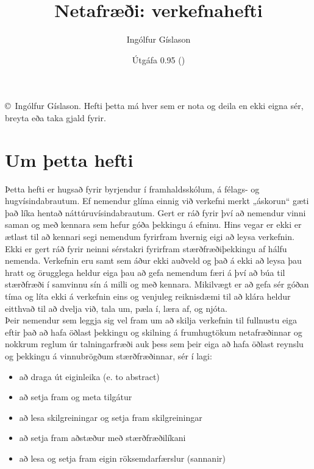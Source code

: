 \documentclass[b5paper,12pt]{book}
\title{\Huge Netafræði: verkefnahefti}
\author{Ingólfur Gíslason}
\date{Útgáfa 0.95 (\the\year)}
\begin{document}
\maketitle

\vspace*{\fill}
\begin{minipage}[b]{0.9\textwidth}
\footnotesize\raggedright
\setlength{\parskip}{0.5\baselineskip}
\copyright \the\year\ Ingólfur Gíslason. Hefti þetta má hver sem er nota og deila en ekki eigna sér, breyta eða taka gjald fyrir.   
\end{minipage}

\frontmatter
\pagestyle{plain}
\chapter{Um þetta hefti} 
Þetta hefti er hugsað fyrir byrjendur í framhaldsskólum, á félags- og hugvísindabrautum. Ef nemendur glíma einnig við verkefni merkt „áskorun“ gæti það líka hentað náttúruvísindabrautum. Gert er ráð fyrir því að nemendur vinni saman og með kennara sem hefur góða þekkingu á efninu. Hins vegar er ekki er ætlast til að kennari segi nemendum fyrirfram hvernig eigi að leysa verkefnin. Ekki er gert ráð fyrir neinni sérstakri fyrirfram stærðfræðiþekkingu af hálfu nemenda. Verkefnin eru samt sem áður ekki auðveld og það á ekki að leysa þau hratt og örugglega heldur eiga þau að gefa nemendum færi á því að búa til stærðfræði í samvinnu sín á milli og með kennara. Mikilvægt er að gefa sér góðan tíma og líta ekki á verkefnin eins og venjuleg reiknisdæmi til að klára heldur eitthvað til að dvelja við, tala um, pæla í, læra af, og njóta.\\

\noindent
Þeir nemendur sem leggja sig vel fram um að skilja verkefnin til fullnustu eiga eftir það að hafa öðlast þekkingu og skilning á frumhugtökum netafræðinnar og nokkrum reglum úr talningarfræði auk þess sem þeir eiga að hafa öðlast reynslu og þekkingu á vinnubrögðum stærðfræðinnar, sér í lagi: 
\begin{itemize}
    \item að draga út eiginleika (e. to abstract)
    \item að setja fram og meta tilgátur
    \item að lesa skilgreiningar og setja fram skilgreiningar
    \item að setja fram aðstæður með stærðfræðilíkani 
    \item að lesa og setja fram eigin röksemdarfærslur (sannanir)
\end{itemize}
\end{document}
